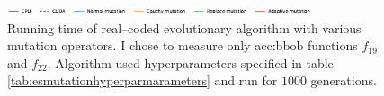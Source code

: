\begin{figure}[ht!]
    \begin{minipage}{\textwidth}
        \centering
        \includegraphics[width=0.8\textwidth]{img/runs/time_es_mutation_legend.pdf}
    \end{minipage}

    \caption[Running time of mutation operators]{Running time of real--coded evolutionary algorithm with various mutation operators. I chose to measure only \acrshort{acc:bbob} functions $f_{19}$ and $f_{22}$. Algorithm used hyperparameters specified in table \ref{tab:esmutationhyperparmarameters} and run for $1000$ generations.}
    \label{meas:muttime}
\end{figure}



